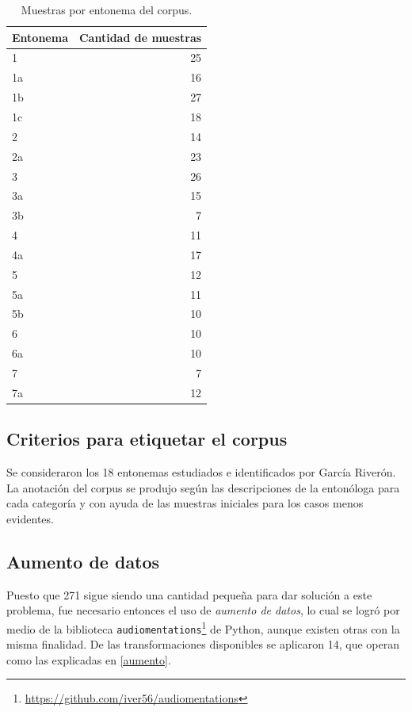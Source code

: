 \begin{table}
\begin{center}
\begin{tabular}{l|r} \hline
\bf Entonema & \bf Cantidad de muestras \\ \hline
 1 & 25 \\ 
 1a & 16 \\ 
 1b & 27 \\ 
 1c & 18 \\ 
 2 & 14 \\ 
 2a & 23 \\ 
 3 & 26 \\ 
 3a & 15 \\ 
 3b & 7 \\
 4 & 11 \\
 4a & 17 \\
 5 & 12 \\
 5a & 11 \\
 5b & 10 \\
 6 & 10 \\
 6a & 10 \\
 7 & 7 \\
 7a & 12 \\ \hline
 
\end{tabular}
\caption{Muestras por entonema del corpus.}\label{Ta:tablita}
\end{center}
\end{table}




\subsection{Criterios para etiquetar el corpus}

Se consideraron los 18 entonemas estudiados e identificados por Garc\'ia River\'on. La anotaci\'on del corpus se produjo seg\'un las descripciones de la enton\'ologa para cada categor\'ia y con ayuda de las muestras iniciales para los casos menos evidentes.


\subsection{Aumento de datos} 
Puesto que 271 sigue siendo una cantidad pequeña para dar soluci\'on a este problema, fue necesario entonces el uso de \emph{aumento de datos}, lo cual se logr\'o por medio de la biblioteca \texttt{audiomentations}\footnote{\url{https://github.com/iver56/audiomentations}} de Python, aunque existen otras con la misma finalidad. De las transformaciones disponibles se aplicaron 14, que operan como las explicadas en \ref{aumento}.

